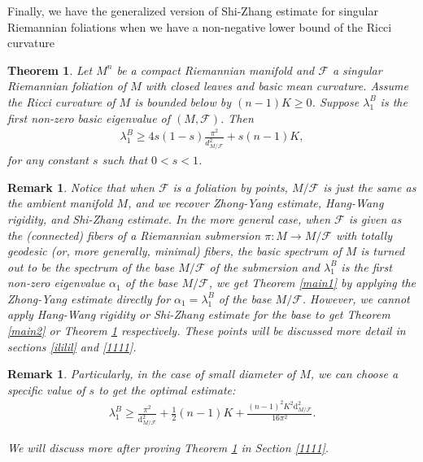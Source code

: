 \documentclass[11pt]{amsart}
\newtheorem{theorem}{Theorem}[section]
\newtheorem{remark}[prop]{Remark}
\def\d{\mathrm{d}}
\begin{document}
Finally, we have the generalized version of Shi-Zhang estimate for singular Riemannian foliations when we have a non-negative lower bound of the Ricci curvature
\begin{theorem}
   \label{main}
    Let $M^n$ be a compact Riemannian manifold and $\mathcal{F}$ a singular Riemannian foliation of $M$ with closed leaves and basic mean curvature. Assume the Ricci curvature of $M$ is bounded below by $(n-1)K\geq 0$. Suppose $\lambda_1^B$ is the first non-zero basic eigenvalue of $(M,\mathcal{F})$. Then
    \begin{align}\label{uuuuuu}
        \lambda_1^B\geq 4s(1-s)\frac{\pi^2}{d_{M/\mathcal{F}}^2}+s(n-1)K,
    \end{align}for any constant $s$ such that $0<s<1$.
    

    
\end{theorem}
\begin{remark}Notice that when $\mathcal{F}$ is a foliation by points, $M/\mathcal{F}$ is just the same as the ambient manifold $M$, and we recover Zhong-Yang estimate, Hang-Wang rigidity, and Shi-Zhang estimate. In the more general case, when $\mathcal{F}$ is given as the (connected) fibers of a Riemannian submersion $\pi:M\to M/\mathcal{F}$ with totally geodesic (or, more generally, minimal) fibers, the basic spectrum of $M$ is turned out to be the spectrum of the base $M/\mathcal{F}$ of the submersion and $\lambda_1^B$ is the first non-zero eigenvalue $\alpha_1$ of the base $M/\mathcal{F}$, we get Theorem \ref{main1} by applying the Zhong-Yang estimate directly for $\alpha_1=\lambda_1^B$  of the base $M/\mathcal{F}$. However, we cannot apply Hang-Wang rigidity or Shi-Zhang estimate for the base to get Theorem \ref{main2} or Theorem \ref{main} respectively. These points will be discussed more detail in sections \ref{ililil} and \ref{1111}.
\end{remark}
\begin{remark}
    Particularly, in the case of small diameter of $M$, we can choose a specific value of $s$ to get the optimal estimate:
    \begin{align*}
        \lambda_1^B\geq\frac{\pi^2}{\d_{M/\mathcal{F}}^2}+\frac{1}{2}(n-1)K+\frac{(n-1)^2K^2\d_{M/\mathcal{F}}^2}{16\pi^2}.
    \end{align*}

    We will discuss more after proving Theorem \ref{main} in Section \ref{1111}.
\end{remark}
\end{document}
